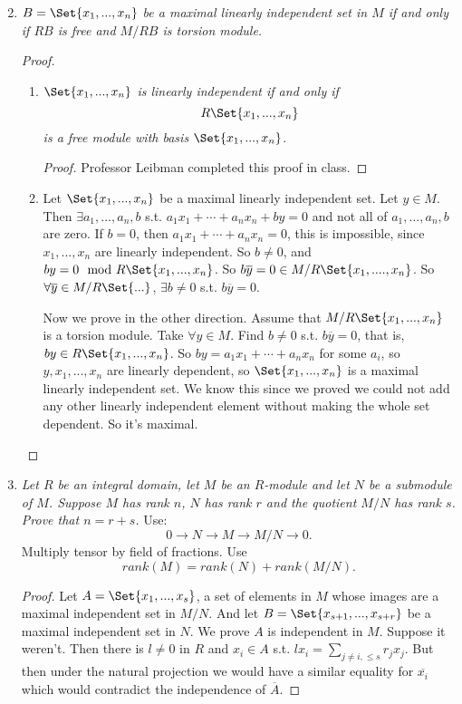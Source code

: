 \documentclass[9pt,reqno,twoside]{amsbook}
\theoremstyle{plain}
\numberwithin{section}{chapter}
\numberwithin{equation}{chapter}
\theoremstyle{definition}
\theoremstyle{remark}
\theoremstyle{plain}
\renewcommand{\leq}{\leqslant}
\renewcommand{\bar}{\overline}%
\begin{document}
\begin{enumerate}[label=\arabic*.]
\setcounter{enumi}{1}
\item \textit{$B = \Set{x_1,...,x_n}$ be a maximal linearly independent set in $M$ if and only if $RB$ is free and $M/RB$ is torsion module. }

\begin{proof}
\begin{enumerate}
\item 
\textit{$\Set{x_1,...,x_n}$ is linearly independent if and only if 
$$
R\Set{x_1,...,x_n}
$$ is a free module with basis $\Set{x_1,...,x_n}$. }
\begin{proof}
Professor Leibman completed this proof in class. 
\end{proof}
\item Let $\Set{x_1,...,x_n}$ be a maximal linearly independent set. Let $y  \in M$. Then $\exists a_1,...,a_n,b$ s.t. $a_1x_1 + \cdots + a_nx_n + by = 0$ and not all of $a_1,...,a_n,b$ are zero. If $b = 0$, then $a_1x_1 + \cdots + a_nx_n = 0$, this is impossible, since $x_1,...,x_n$ are linearly independent. So $b \neq 0$, and $by=  0 \mod R\Set{x_1,...,x_n}$. So $b\bar{y} = 0 \in M/R\Set{x_1,....,x_n}$. So $\forall \bar{y} \in M/R\Set{...}$, $\exists b \neq 0$ s.t. $b\bar{y} = 0$. 

Now we prove in the other direction. Assume that $M/R\Set{x_1,...,x_n}$ is a torsion module. Take $\forall y \in M$. Find $b \neq 0$ s.t. $b \bar{y} = 0$, that is, $by \in R\Set{x_1,...,x_n}$. So $by = a_1x_1 + \cdots + a_nx_n$ for some $a_i$, so $y,x_1,...,x_n$ are linearly dependent, so $\Set{x_1,...,x_n}$ is a maximal linearly independent set. We know this since we proved we could not add any other linearly independent element without making the whole set dependent. So it's maximal. 
\end{enumerate}
\end{proof}

\setcounter{enumi}{3}
\item \textit{Let $R$ be an integral domain, let $M$ be an $R$-module and let $N$ be a submodule of $M$. Suppose $M$ has rank $n$, $N$ has rank $r$ and the quotient $M/N$ has rank $s$. Prove that $n = r +s$. }
Use:
$$
0 \to N \to M \to M/N \to 0.
$$
Multiply tensor by field of fractions. Use 
$$rank(M) = rank(N) + rank(M/N).$$

\begin{proof}
Let $A = \Set{x_1,...,x_s}$, a set of elements in $M$ whose images are a maximal independent set in $M/N$. And let $B = \Set{x_{s + 1},...,x_{s + r}}$ be a maximal independent set in $N$. We prove $A$ is independent in $M$. Suppose it weren't. Then there is $l \neq 0$ in $R$ and $x_i \in A$ s.t. $lx_i = \sum_{j \neq i, \leq s} r_jx_j$. But then under the natural projection we would have a similar equality for $\bar{x_i}$ which would contradict the independence of $\bar{A}$. 


\end{proof}
\end{enumerate}
\end{document}
